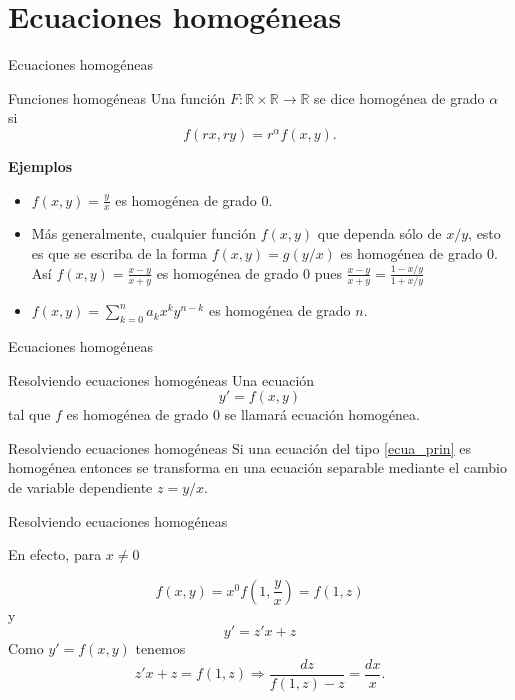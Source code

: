 \documentclass[handout,hyperref={colorlinks=true}]{beamer}
\newcommand{\rr}{\mathbb{R}}
\newcommand{\nl}{\onslide<+-> }
\begin{document}
\section[Homogéneas]{Ecuaciones homogéneas}

\begin{frame}{Ecuaciones homogéneas}

\nl\begin{block}{Funciones homogéneas}
 Una función $F:\rr\times\rr\to\rr$ se dice homogénea de grado $\alpha$ si 
 \[f(rx,ry)=r^{\alpha}f(x,y).\]
\end{block}
\textbf{Ejemplos}
\begin{itemize}
                 \nl\item $f(x,y)=\tfrac{y}{x}$ es homogénea de grado $0$.
                \nl \item Más generalmente, cualquier función $f(x,y)$ que dependa sólo de $x/y$, esto es que se escriba de la forma $f(x,y)=g(y/x)$
                 es homogénea de grado  $0$. Así $f(x,y)=\tfrac{x-y}{x+y}$ es homogénea de grado $0$ pues $\tfrac{x-y}{x+y}= \tfrac{1-x/y}{1+x/y}$
                \nl \item $f(x,y)=\sum_{k=0}^na_kx^ky^{n-k}$ es homogénea de grado $n$.
\end{itemize}

\end{frame}

\begin{frame}{Ecuaciones homogéneas}

\nl\begin{block}{Resolviendo ecuaciones homogéneas}
 Una ecuación 
 \begin{equation}\label{ecua_prin}y'=f(x,y)\end{equation}
 tal que $f$ es homogénea de grado $0$ se llamará ecuación homogénea.
\end{block}

\nl\begin{block}{Resolviendo ecuaciones homogéneas}
 Si una ecuación del tipo \eqref{ecua_prin} es homogénea entonces se transforma en una ecuación separable mediante el cambio de variable dependiente $\boxed{z=y/x}$.
\end{block}


\end{frame}


\begin{frame}{Resolviendo ecuaciones homogéneas}

En efecto, para $x\neq 0$

\[f(x,y)=x^0f\left(1,\frac{y}{x}\right)=f(1,z)\]
y
\[y'=z'x+z\]
Como $y'=f(x,y)$ tenemos
\begin{equation}\label{cambio_hom}z'x+z=f(1,z)\Longrightarrow \frac{dz}{f(1,z)-z}=\frac{dx}{x}.\end{equation}
\end{frame}
\end{document}
